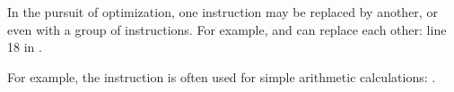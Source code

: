 In the pursuit of optimization, one instruction may be replaced by another, or even with a group of instructions.
For example, \ADD and \SUB can replace each other:
line 18 in .

For example, the \LEA instruction is often used for simple arithmetic calculations: .




